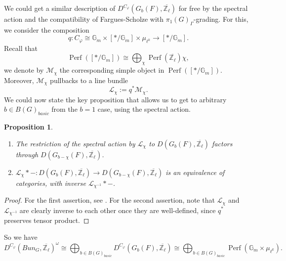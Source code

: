\documentclass{article}
\newtheorem{proposition}{Proposition}
\newcommand{\Perf}{\operatorname{Perf}}
\begin{document}
We could get a similar description of $D^{C_{\varphi}}(G_b(F), \overline{\mathbb{Z}_{\ell}})$ for free by the spectral action and the compatibility of Fargues-Scholze with $\pi_1(G)_{\Gamma}$-grading. For this, we consider the composition
$$q: C_{\varphi} \cong \mathbb{G}_m \times [*/\mathbb{G}_m] \times \mu_{\ell^k} \to [*/\mathbb{G}_m].$$
Recall that 
$$\Perf([*/\mathbb{G}_m]) \cong \bigoplus_{\chi}\Perf(\overline{\mathbb{Z}_{\ell}})\chi,$$
we denote by $\mathcal{M}_{\chi}$ the corresponding simple object in $\Perf([*/\mathbb{G}_m])$. Moreover, $\mathcal{M}_{\chi}$ pullbacks to a line bundle
$$\mathcal{L}_{\chi}:=q^*\mathcal{M}_{\chi}.$$
We could now state the key proposition that allows us to get to arbitrary $b \in B(G)_{basic}$ from the $b=1$ case, using the spectral action.
\begin{proposition}\label{Prop Spectral action}
	\begin{enumerate}
		\item The restriction of the spectral action by $\mathcal{L}_{\chi}$ to $D(G_b(F), \overline{\mathbb{Z}_{\ell}})$ factors through $D(G_{b-\chi}(F), \overline{\mathbb{Z}_{\ell}})$.
		
		\item $\mathcal{L}_{\chi}*-: D(G_b(F), \overline{\mathbb{Z}_{\ell}}) \to D(G_{b-\chi}(F), \overline{\mathbb{Z}_{\ell}})$ is an equivalence of categories, with inverse $\mathcal{L}_{\chi^{-1}}*-$.
	\end{enumerate}
\end{proposition}

\begin{proof}
	For the first assertion, see \cite[Lemma 5.3.2]{zou2022categorical}. For the second assertion, note that $\mathcal{L}_{\chi}$ and $\mathcal{L}_{\chi^{-1}}$ are clearly inverse to each other once they are well-defined, since $q^*$ preserves tensor product.
\end{proof}
So we have 
$$D^{C_{\varphi}}(Bun_G, \overline{\mathbb{Z}_{\ell}})^{\omega} \cong \bigoplus_{b \in B(G)_{basic}}D^{C_{\varphi}}(G_b(F), \overline{\mathbb{Z}_{\ell}}) \cong \bigoplus_{b \in B(G)_{basic}}\Perf(\mathbb{G}_m \times \mu_{\ell^k}).$$
\end{document}
